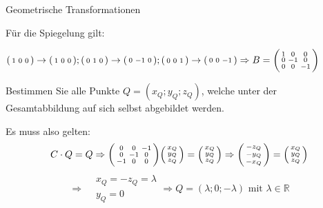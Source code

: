 \begin{example2}{Geometrische Transformationen}
    \vspace{2mm}

Für die Spiegelung gilt:

$
\begin{psmallmatrix}
    1 & 0 & 0
\end{psmallmatrix} \rightarrow \begin{psmallmatrix}
    1 & 0 & 0
\end{psmallmatrix} ; \begin{psmallmatrix}
    0 & 1 & 0
\end{psmallmatrix} \rightarrow \begin{psmallmatrix}
    0 & -1 & 0
\end{psmallmatrix} ; \begin{psmallmatrix}
    0 & 0 & 1
\end{psmallmatrix} \rightarrow \begin{psmallmatrix}
    0 & 0 & -1
\end{psmallmatrix} \\ \Rightarrow B=\begin{psmallmatrix}
    1 & 0 & 0 \\
    0 & -1 & 0 \\
    0 & 0 & -1
\end{psmallmatrix}
$

\vspace{2mm}

Bestimmen Sie alle Punkte $Q=\left(x_{Q} ; y_{Q} ; z_{Q}\right)$, welche unter der Gesamtabbildung auf sich selbst abgebildet werden.

Es muss also gelten:
$$
C \cdot Q=Q \Rightarrow \begin{psmallmatrix}
    0 & 0 & -1 \\
    0 & -1 & 0 \\
    -1 & 0 & 0
\end{psmallmatrix}
\begin{psmallmatrix}
    x_{Q} \\
    y_{Q} \\
    z_{Q}
\end{psmallmatrix}=\begin{psmallmatrix}
    x_{Q} \\
    y_{Q} \\
    z_{Q}
\end{psmallmatrix} \Rightarrow \begin{psmallmatrix}
    -z_{Q} \\
    -y_{Q} \\
    -x_{Q}
\end{psmallmatrix}= \begin{psmallmatrix}
    x_{Q} \\
    y_{Q} \\
    z_{Q}
\end{psmallmatrix} 
$$
$$
\Rightarrow \begin{aligned}
    & x_{Q}=-z_{Q}=\lambda \\
    & y_{Q}=0
\end{aligned} \Rightarrow Q=\left(\lambda ; 0 ; -\lambda\right) \text { mit } \lambda \in \mathbb{R}
$$


\end{example2}
